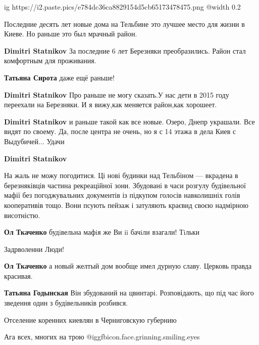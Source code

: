 \begin{itemize}

\ifcmt
  ig https://i2.paste.pics/e784dc36ca8829154d5cb65173478475.png
  @width 0.2
\fi


Последние десять лет новые дома на Тельбине это лучшее место для жизни в Киеве.
Но раньше это был мрачный район.

\begin{itemize} %
\textbf{Dimitri Statnikov} За последние 6 лет Березняки преобразились.
Район стал комфортным для проживания.

\textbf{Татьяна Сирота} даже ещё раньше!

\textbf{Dimitri Statnikov} Про раньше не могу сказать.У нас дети в 2015 году переехали на Березняки. И я вижу,как меняется район,как хорошеет.

\textbf{Dimitri Statnikov} и раньше такой как все новые. Озеро, Днепр украшали. Все видят по своему. Да, после центра не очень, но я с 14 этажа в дела Киев с Выдубичей...
Удачи

\textbf{Dimitri Statnikov} 

На жаль не можу погодитися. Ці нові будинки над Тельбіном — вкрадена в
березняківців частина рекреаційної зони. Збудовані в часи розгулу будівельної
мафії без погоджувальних документів із підкупом голосів навколишніх голів
кооперативів тощо. Вони псують пейзаж і затуляють краєвид своєю надмірною
висотністю.

\begin{itemize} %
\textbf{Ол Ткаченко} будiвельна мафiя же Ви ii бачiли взагали! Тiльки

Задрволенни Люди!

\textbf{Ол Ткаченко} а новый желтый дом вообще имел дурную славу. Церковь правда красивая.

\textbf{Татьяна Годынская} Він збудований на цвинтарі. Розповідають, що під час його зведення один з будівельників розбився.
\end{itemize} %

\end{itemize} %

Отселение коренних киевлян в Черниговскую губернию

\begin{itemize} %
Ага всех, многих на трою @igg{fbicon.face.grinning.smiling.eyes} 


\end{itemize}
\end{itemize}
